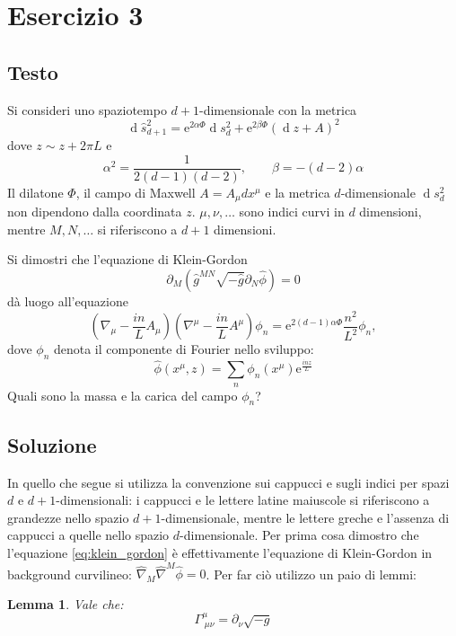 \documentclass[]{scrartcl}
\newtheorem{lemma}{Lemma}
\newcommand{\me}{\mathrm{e}}
\newcommand{\pd}{\partial}
\newcommand{\sg}{\sqrt{-g}}
\newcommand{\hg}{\hat{g}}
\renewcommand{\d}[1]{\ensuremath{\operatorname{d}\!{#1}}}
\begin{document}
\section*{Esercizio 3}

\subsection*{Testo}
Si consideri uno spaziotempo $ d + 1 $-dimensionale con la metrica
\begin{equation}
  \label{eq:metrica_problema_3}
  \d{\hat{s}^2_{d+1}} = \me^{2\alpha \Phi} \d {s^2_d} + \me^{2 \beta \Phi} \left( \d z + A \right)^2
\end{equation}
dove $ z \sim z + 2\pi L $ e
\[
  \alpha^2 = \frac{1}{2 \left( d - 1 \right) \left( d - 2 \right) }, \qquad \beta = - \left( d - 2 \right) \alpha
\]
Il dilatone $ \Phi $, il campo di Maxwell $ A = A_\mu dx^\mu $ e la metrica $d$-dimensionale $ \d{s^2_d} $ non dipendono dalla coordinata
$ z $. $ \mu, \nu, \dots $ sono indici curvi in $ d $ dimensioni, mentre $ M, N, \dots $ si riferiscono a $ d + 1 $ dimensioni.

Si dimostri che l'equazione di Klein-Gordon
\begin{equation}
  \label{eq:klein_gordon}
  \pd_M \left( \hg^{MN}\sqrt{-\hg} \pd_N \hat{\phi} \right) = 0
\end{equation}
dà luogo all'equazione
\begin{equation}
  \label{eq:equazione_es_3}
  \left( \nabla_\mu - \frac{in}{L} A_\mu \right) \left( \nabla^\mu - \frac{in}{L} A^\mu  \right) \phi_n = \me^{2 \left(d-1\right) \alpha \Phi}\frac{n^2}{L^2}\phi_n,
\end{equation}
dove $ \phi_n $ denota il componente di Fourier nello sviluppo:
\[
\hat{\phi}(x^\mu, z) = \sum_n \phi_n(x^\mu) \me^{\frac{inz}{L}}
\]
Quali sono la massa e la carica del campo $ \phi_n $?

\subsection*{Soluzione}
In quello che segue si utilizza la convenzione sui cappucci e sugli indici per spazi $ d $ e $ d+1 $-dimensionali: i cappucci e le lettere latine maiuscole
si riferiscono a grandezze nello spazio $ d+1 $-dimensionale, mentre le lettere greche e l'assenza di cappucci a quelle nello spazio $ d $-dimensionale.
Per prima cosa dimostro che l'equazione \eqref{eq:klein_gordon} è effettivamente l'equazione di Klein-Gordon in background curvilineo:
$ \hat{\nabla}_M \hat{\nabla}^M \hat{\phi} = 0 $.
Per far ciò utilizzo un paio di lemmi:
\begin{lemma}
  \label{lem:traccia_simboli}
  Vale che:
  \begin{equation}
    \label{eq:traccia_cristhoffel}
    \Gamma^\mu_{\;\mu\nu} = \pd_\nu \sg
  \end{equation}
\end{lemma}
\end{document}

